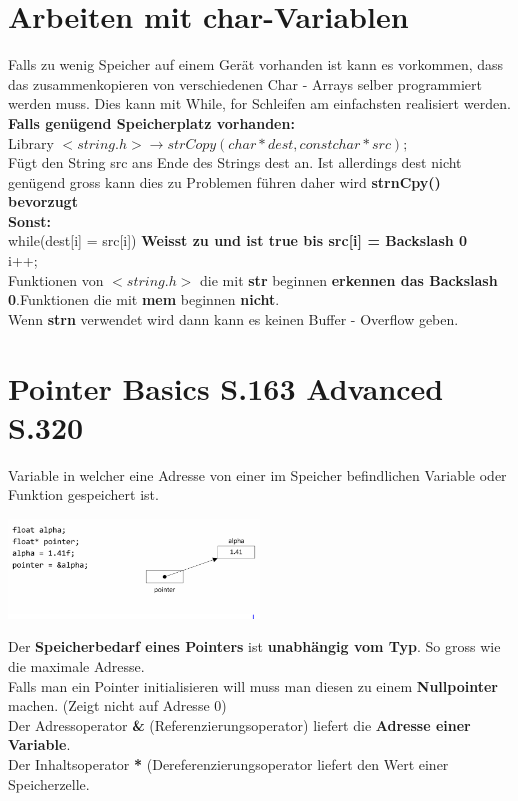 \documentclass{article}
\begin{document}
\section{Arbeiten mit char-Variablen}
Falls zu wenig Speicher auf einem Gerät vorhanden ist kann es vorkommen, dass das zusammenkopieren von verschiedenen Char - Arrays selber programmiert werden muss.
Dies kann mit While, for Schleifen am einfachsten realisiert werden.\\
\textbf{Falls genügend Speicherplatz vorhanden: } \\
Library $ <string.h> \rightarrow strCopy(char* dest, const char* src);$ \\
Fügt den String src ans Ende des Strings dest an. Ist allerdings dest nicht genügend gross kann dies zu Problemen führen daher wird \textbf{strnCpy() bevorzugt}\\
\textbf{Sonst: }\\
while(dest[i] = src[i]) \textbf{Weisst zu und ist true bis src[i] = Backslash 0}\\
    i++; \\
Funktionen von $<string.h>$ die mit \textbf{str} beginnen \textbf{erkennen das Backslash 0}.Funktionen die mit \textbf{mem} beginnen \textbf{nicht}. \\
Wenn \textbf{strn} verwendet wird dann kann es keinen Buffer - Overflow geben.  
\section{Pointer Basics S.163 Advanced S.320}
\begin{multicols}{2}
\begin{center}
Variable in welcher eine Adresse von einer im Speicher befindlichen Variable oder Funktion gespeichert ist. 
\end{center}
\columnbreak
\includegraphics[width=0.5\textwidth]{Pointer_Basics.PNG}
\end{multicols}
Der \textbf{Speicherbedarf eines Pointers} ist \textbf{unabhängig vom Typ}. So gross wie die maximale Adresse.\\
Falls man ein Pointer initialisieren will muss man diesen zu einem \textbf{Nullpointer} machen. (Zeigt nicht auf Adresse 0) \\
Der Adressoperator \textbf{\&} (Referenzierungsoperator) liefert die \textbf{Adresse einer Variable}. \\
Der Inhaltsoperator \textbf{*} (Dereferenzierungsoperator liefert den Wert einer Speicherzelle.
\end{document}
